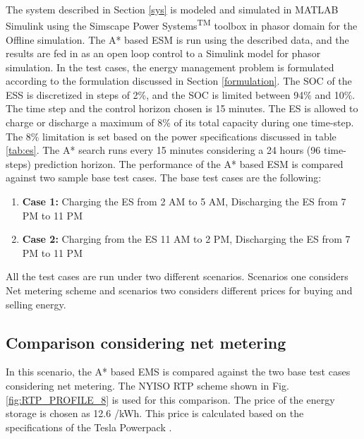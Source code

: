 The system described in Section \ref{sys} is modeled and simulated in MATLAB\textsuperscript{\textregistered} Simulink\textsuperscript{\textregistered} using the Simscape Power Systems\textsuperscript{TM} toolbox in phasor domain for the Offline simulation. The A* based ESM is run using the described data, and the results are fed in as an open loop control to a Simulink model for phasor simulation. In the test cases, the energy management problem is formulated according to the formulation discussed in Section \ref{formulation}. The  SOC of the ESS is discretized in steps of 2\%, and the SOC is limited between  94\%  and  10\%. The time step and the control horizon chosen is 15 minutes. The ES is allowed to charge or discharge a maximum of 8\% of its total capacity during one time-step. The 8\% limitation is set based on the power specifications discussed in table \ref{tab:es}. The A* search runs every 15 minutes considering a 24 hours (96 time-steps) prediction horizon. The performance of the A* based ESM is compared against two sample base test cases. The base test cases are the following:

\begin{enumerate}
\item \textbf{Case 1:} Charging the ES from 2 AM to 5 AM, Discharging the ES from 7 PM to 11 PM

\item \textbf{Case 2:} Charging from the ES 11 AM to 2 PM, Discharging the ES from 7 PM to 11 PM
\end{enumerate}

All the test cases are run under two different scenarios. Scenarios one considers Net metering scheme and  scenarios two considers different prices for buying and selling energy.

\subsection{Comparison considering net metering} \label{netmeter}
In this scenario, the A* based EMS is compared against the two base test cases considering net metering. The NYISO RTP scheme shown in Fig. \ref{fig:RTP_PROFILE_8} is used for this comparison. The price of the energy storage is chosen as 12.6 \cent/kWh. This price is calculated based on the specifications of the Tesla Powerpack \cite{tesla_powerpack_2018}.


